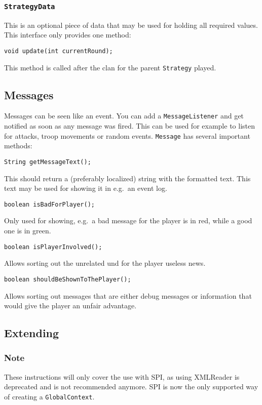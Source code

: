 \documentclass{article}
\begin{document}
\subsubsection{\texttt{StrategyData}}
This is an optional piece of data that may be used for holding all required values. This interface only provides one method:
\begin{verbatim}
void update(int currentRound);
\end{verbatim}
This method is called after the clan for the parent \texttt{Strategy} played.

\subsection{Messages}
Messages can be seen like an event. You can add a \texttt{MessageListener} and get notified as soon as any message was fired. This can be used for example to listen for attacks, troop movements or random events.
\texttt{Message} has several important methods:
\begin{verbatim}
String getMessageText();
\end{verbatim}
This should return a (preferably localized) string with the formatted text. This text may be used for showing it in e.g.\ an event log.
\begin{verbatim}
boolean isBadForPlayer();
\end{verbatim}
Only used for showing, e.g.\ a bad message for the player is in red, while a good one is in green.
\begin{verbatim}
boolean isPlayerInvolved();
\end{verbatim}
Allows sorting out the unrelated und for the player useless news.
\begin{verbatim}
boolean shouldBeShownToThePlayer();
\end{verbatim}
Allows sorting out messages that are either debug messages or information that would give the player an unfair advantage.
\newpage


\subsection{Extending}
\subsubsection{Note}
These instructions will only cover the use with SPI, as using XMLReader is deprecated and is not recommended anymore.\newline
SPI is now the only supported way of creating a \texttt{GlobalContext}.
\end{document}

